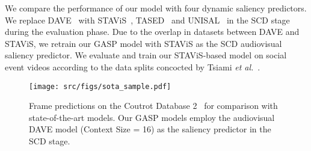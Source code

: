 \documentclass{article}
\begin{document}
We compare the performance of our model with four dynamic saliency predictors. We replace DAVE~\cite{tavakoli2020deep} with STAViS~\cite{tsiami2020stavis}, TASED~\cite{min2019tased} and UNISAL~\cite{droste2020unifiedia} in the SCD stage during the evaluation phase. 
Due to the overlap in datasets between DAVE and STAViS, we retrain our GASP model with STAViS as the SCD audiovisual saliency predictor. We evaluate and train our STAViS-based model on social event videos according to the data splits concocted by Tsiami \textit{et al.}~. 



\begin{figure*}[hbt!]
\centering

\setlength{\tabcolsep}{1pt} \renewcommand{\arraystretch}{0.5} \texttt{[image: src/figs/sota\_sample.pdf]}
\caption{Frame predictions on the Coutrot Database 2~\protect\cite{coutrot2015efficient} for comparison with state-of-the-art models. Our GASP models employ the audiovisual DAVE model (Context Size = 16) as the saliency predictor in the SCD stage.}
\label{fig:sota_samples}
\end{figure*}
\end{document}
